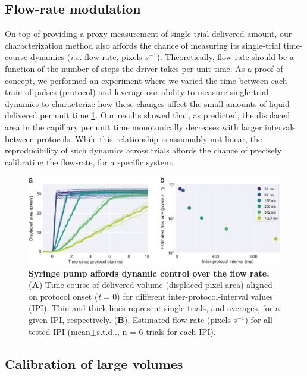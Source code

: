 \subsection*{Flow-rate modulation}
On top of providing a proxy measurement of single-trial delivered amount, our characterization method also affords the chance of measuring its single-trial time-course dynamics (\textit{i.e.} flow-rate, pixels $s^{-1}$). Theoretically, flow rate should be a function of the number of steps the driver takes per unit time. As a proof-of-concept, we performed an experiment where we varied the time between each train of pulses (protocol) and leverage our ability to measure single-trial dynamics to characterize how these changes affect the small amounts of liquid delivered per unit time \ref{fig:FlowRateControl}. Our results showed that, as predicted, the displaced area in the capillary per unit time monotonically decreases with larger intervals between protocols. While this relationship is assumably not linear, the reproducibility of such dynamics across trials affords the chance of precisely calibrating the flow-rate, for a specific system.

\begin{figure}
	\centering
	\includegraphics[width=1.0\linewidth]{Figures/Artboard 3.pdf}
	\caption{\textbf{Syringe pump affords dynamic control over the flow rate.}\\
		(\textbf{A}) Time course of delivered volume (displaced pixel area) aligned on protocol onset (\textit{t} = 0) for different inter-protocol-interval values (IPI). Thin and thick lines represent single trials, and averages, for a given IPI, respectively. (\textbf{B}). Estimated flow rate (pixels s$^{-1}$) for all tested IPI (mean$\pm$s.t.d.., n = 6 trials for each IPI).}
	\label{fig:FlowRateControl} 
\end{figure}

\subsection*{Calibration of large volumes}



